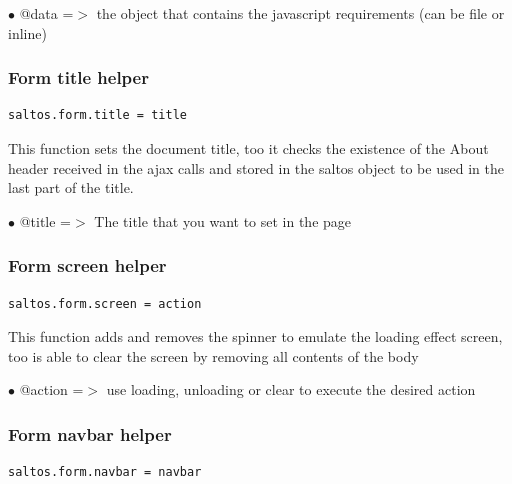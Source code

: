 \documentclass[a4paper]{article}
\begin{document}
\begin{compactitem}
\item[\color{myblue}$\bullet$] @data =$>$ the object that contains the javascript requirements (can be file or inline)
\end{compactitem}

\hypertarget{toc231}{}
\subsubsection{Form title helper}

\begin{lstlisting}
saltos.form.title = title
\end{lstlisting}

This function sets the document title, too it checks the existence of the About
header received in the ajax calls and stored in the saltos object to be used in the
last part of the title.

\begin{compactitem}
\item[\color{myblue}$\bullet$] @title =$>$ The title that you want to set in the page
\end{compactitem}

\hypertarget{toc232}{}
\subsubsection{Form screen helper}

\begin{lstlisting}
saltos.form.screen = action
\end{lstlisting}

This function adds and removes the spinner to emulate the loading effect screen, too is able
to clear the screen by removing all contents of the body

\begin{compactitem}
\item[\color{myblue}$\bullet$] @action =$>$ use loading, unloading or clear to execute the desired action
\end{compactitem}

\hypertarget{toc233}{}
\subsubsection{Form navbar helper}

\begin{lstlisting}
saltos.form.navbar = navbar
\end{lstlisting}
\end{document}
